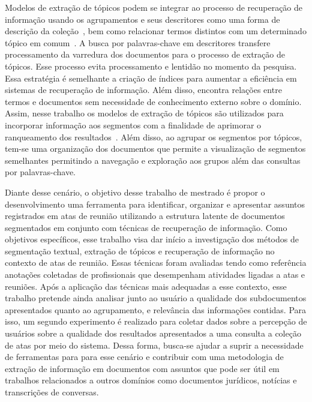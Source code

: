 Modelos de extração de tópicos podem se integrar ao processo de recuperação de informação usando os agrupamentos e seus descritores como uma forma de descrição da coleção~\cite{Zhai2017, Xing2009}, bem como relacionar termos distintos com um determinado tópico em comum~\cite{WEIXING}.  
A busca por palavras-chave em descritores transfere processamento da varredura dos documentos para o processo de extração de tópicos. Esse processo evita processamento e lentidão no momento da pesquisa. Essa estratégia é semelhante a criação de índices para aumentar a eficiência em sistemas de recuperação de informação. Além disso, encontra relações entre termos e documentos sem necessidade de conhecimento externo sobre o domínio.
%
Assim, nesse trabalho os modelos de extração de tópicos são utilizados para incorporar informação aos segmentos com a finalidade de aprimorar o ranqueamento dos resultados~\cite{Maracini2010, WEIXING}. 
% 
Além disso, ao agrupar os segmentos por tópicos, tem-se uma organização dos documentos que permite a visualização de segmentos semelhantes permitindo a navegação e exploração aos grupos além das consultas por palavras-chave.
%











Diante desse cenário, o objetivo desse trabalho de mestrado é propor o desenvolvimento uma ferramenta para identificar, organizar e apresentar assuntos registrados em atas de reunião utilizando a estrutura latente de documentos segmentados em conjunto com técnicas de recuperação de informação. 
%
%
Como objetivos específicos, esse trabalho visa  
% 
dar início a investigação dos métodos de segmentação textual, extração de tópicos e recuperação de informação no contexto de atas de reunião. Essas técnicas foram avaliadas tendo como referência anotações coletadas de profissionais que desempenham atividades ligadas a atas e reuniões.
% 
Após a aplicação das técnicas mais adequadas a esse contexto, esse trabalho pretende ainda analisar junto ao usuário a qualidade dos subdocumentos apresentados quanto ao agrupamento, e relevância das informações contidas. Para isso, um segundo experimento é realizado para coletar dados sobre a percepção de usuários sobre a qualidade dos resultados apresentados a uma consulta a coleção de atas por meio do sistema.
% 
% 
Dessa forma, busca-se ajudar a suprir a necessidade de ferramentas para para esse cenário e contribuir com uma metodologia de extração de informação em documentos com assuntos que pode ser útil em trabalhos relacionados a outros domínios como documentos jurídicos, notícias e transcrições de conversas.






